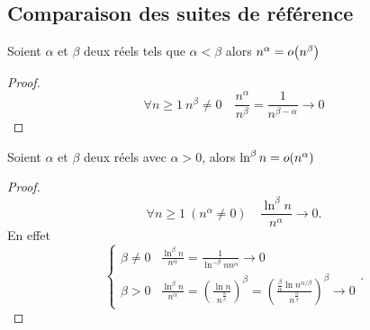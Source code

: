 \subsection{Comparaison des suites de référence}

\begin{prop}
  Soient $\alpha$ et $\beta$ deux réels tels que $\alpha < \beta$ alors $n^\alpha = o\mathopen{}\left(n^\beta\right)$
\end{prop}
\begin{proof}
  \begin{equation}
    \forall n \geqslant 1 \ n^\beta \neq 0 \quad \frac{n^\alpha}{n^\beta}=\frac{1}{n^{\beta-\alpha}} \rightarrow 0
  \end{equation}
\end{proof}

\begin{prop}
  Soient $\alpha$ et $\beta$ deux réels avec $\alpha>0$, alors $\ln^\beta n = o\mathopen{}\left(n^\alpha\right)$
\end{prop}
\begin{proof}
  \begin{equation}
    \forall n \geqslant 1 \ (n^\alpha \neq 0) \quad \frac{\ln^\beta n}{n^\alpha} \rightarrow 0.
  \end{equation}
En effet
\begin{equation}
  \begin{cases}
    \beta \neq 0 & \frac{\ln^\beta n}{n^\alpha}=\frac{1}{\ln^{-\beta} n n^\alpha} \rightarrow 0 \\
    \beta > 0 & \frac{\ln^\beta n}{n^\alpha} = \left(\frac{\ln n}{n^{\frac{\alpha}{\beta}}}\right)^\beta = \left(\frac{\frac{\beta}{\alpha}\ln n^{\alpha/\beta}}{n^{\frac{\alpha}{\beta}}}\right)^\beta \rightarrow 0
  \end{cases}.
\end{equation}
\end{proof}

